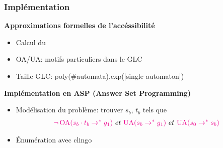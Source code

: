 \begin{frame}[c]
\frametitle{Implémentation}
\textbf{Approximations formelles de l'accéssibilité}
\begin{itemize}
\item Calcul du  
\item OA/UA: motifs particuliers dans le GLC
\item Taille GLC: poly(\#automata),exp(|single automaton|)
\end{itemize}
\bigskip
\textbf{Implémentation en ASP (Answer Set Programming)}
\begin{itemize}
\item Modélisation du problème: trouver $s_b$, $t_b$ tels que
\begin{align*}
{\color{magenta} \neg \OA{s_b \cdot t_b}{g_1}} \ et\ {\color{magenta}\UA{s_b}{g_1}}\ et \  {\color{magenta}\UA{s_0}{s_b}}
\end{align*}
\item \'Enumération  avec  clingo
\end{itemize}
\end{frame}
